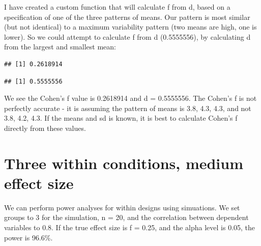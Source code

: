 \documentclass[]{book}
\newenvironment{Shaded}{\begin{snugshade}}{\end{snugshade}}
\newcommand{\DataTypeTok}[1]{\textcolor[rgb]{0.13,0.29,0.53}{#1}}
\newcommand{\KeywordTok}[1]{\textcolor[rgb]{0.13,0.29,0.53}{\textbf{#1}}}
\newcommand{\NormalTok}[1]{#1}
\newcommand{\OperatorTok}[1]{\textcolor[rgb]{0.81,0.36,0.00}{\textbf{#1}}}
\newcommand{\StringTok}[1]{\textcolor[rgb]{0.31,0.60,0.02}{#1}}
\begin{document}
I have created a custom function that will calculate f from d, based on a specification of one of the three patterns of means. Our pattern is most similar (but not identical) to a maximum variability pattern (two means are high, one is lower). So we could attempt to calculate f from d (0.5555556), by calculating d from the largest and smallest mean:

\begin{Shaded}
\end{Shaded}

\begin{verbatim}
## [1] 0.2618914
\end{verbatim}

\begin{Shaded}
\end{Shaded}

\begin{verbatim}
## [1] 0.5555556
\end{verbatim}

We see the Cohen's f value is 0.2618914 and d = 0.5555556. The Cohen's f is not perfectly accurate - it is assuming the pattern of means is 3.8, 4.3, 4.3, and not 3.8, 4.2, 4.3. If the means and sd is known, it is best to calculate Cohen's f directly from these values.

\hypertarget{three-within-conditions-medium-effect-size}{%
\section{Three within conditions, medium effect size}\label{three-within-conditions-medium-effect-size}}

We can perform power analyses for within designs using simuations. We set groups to 3 for the simulation, n = 20, and the correlation between dependent variables to 0.8. If the true effect size is f = 0.25, and the alpha level is 0.05, the power is 96.6\%.
\end{document}
